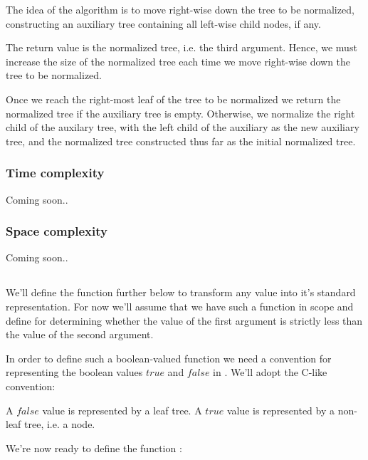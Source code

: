 The idea of the algorithm is to move right-wise down the tree to be normalized,
constructing an auxiliary tree containing all left-wise child nodes, if any.

The return value is the normalized tree, i.e. the third argument. Hence, we
must increase the size of the normalized tree each time we move right-wise down
the tree to be normalized.

Once we reach the right-most leaf of the tree to be normalized we return the
normalized tree if the auxiliary tree is empty. Otherwise, we normalize the
right child of the auxilary tree, with the left child of the auxiliary as the
new auxiliary tree, and the normalized tree constructed thus far as the initial
normalized tree.

\subsubsection{Time complexity}

Coming soon..

\subsubsection{Space complexity}

Coming soon..

\subsection{}\label{section:d-size-less}

We'll define the function  further below to transform any
\D{} value into it's standard representation. For now we'll assume that we have
such a function in scope and define  for determining whether the
value of the first argument is strictly less than the value of the second
argument.

In order to define such a boolean-valued function we need a convention for
representing the boolean values $true$ and $false$ in \D{}. We'll adopt the
C-like convention:

\begin{definition}

A $false$ value is represented by a leaf tree. A $true$ value is represented by
a non-leaf tree, i.e. a node.

\end{definition}

We're now ready to define the function :

